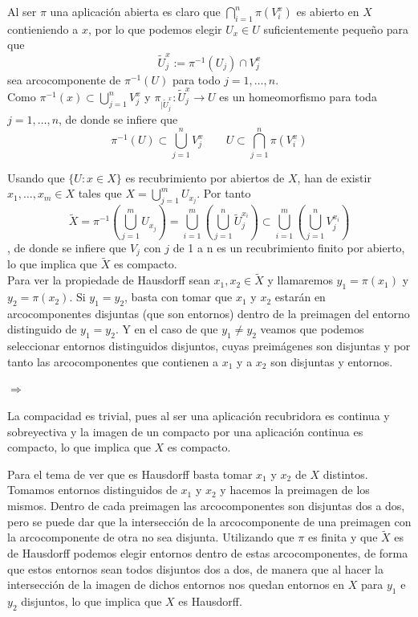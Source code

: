 \documentclass{article}
\begin{document}
Al ser $\pi$ una aplicación abierta es claro que $\bigcap_{i=1}^n \pi(V_i^x)$ es abierto en $X$ contieniendo a $x$, por lo que podemos elegir $U_x\in U$ suficientemente pequeño para que
\begin{equation*}
\tilde{U}_j^x:=\pi^{-1}(U_j)\cap V_j^x
\end{equation*}
sea arcocomponente de $\pi^{-1}(U)$ para todo $j=1,\ldots,n$.\\

Como $\pi^{-1}(x)\subset \bigcup_{j=1}^n V_j^x$ y $\pi_{|\tilde{U}_j^x}:\tilde{U}_j^x\rightarrow U$ es un homeomorfismo para toda $j=1,\ldots,n$, de donde se infiere que
\begin{equation*}
\pi^{-1}(U)\subset \bigcup_{j=1}^n V_j^x \qquad U\subset \bigcap_{j=1}^n \pi(V_i^x)
\end{equation*}

Usando que $\{U:x\in X\}$ es recubrimiento por abiertos de $X$, han de existir $x_1,\ldots,x_m\in X$ tales que $X=\bigcup_{j=1}^m U_{x_j}$. Por tanto
\begin{equation*}
\tilde{X}=\pi^{-1}\left(\bigcup_{j=1}^m U_{x_j}\right) = \bigcup_{i=1}^m \left(\bigcup_{j=1}^n \tilde{U}_j^{x_i}\right)\subset \bigcup_{i=1}^m\left(\bigcup_{j=1}^n V_j^{x_i}\right)
\end{equation*}, de donde se infiere que $V_j$ con $j$ de 1 a n es un recubrimiento finito por abierto, lo que implica que $\tilde{X}$ es compacto.\\

Para ver la propiedade de Hausdorff sean $x_1,x_2\in \tilde{X}$ y llamaremos $y_1=\pi(x_1)$ y $y_2=\pi(x_2)$. Si $y_1=y_2$, basta con tomar que $x_1$ y $x_2$ estarán en arcocomponentes disjuntas (que son entornos) dentro de la preimagen del entorno distinguido de $y_1=y_2$. Y en el caso de que $y_1\neq y_2$ veamos que podemos seleccionar entornos distinguidos disjuntos, cuyas preimágenes son disjuntas y por tanto las arcocomponentes que contienen a $x_1$ y a $x_2$ son disjuntas y entornos.

$\Rightarrow$

La compacidad es trivial, pues al ser una aplicación recubridora es continua y sobreyectiva y la imagen de un compacto por una aplicación continua es compacto, lo que implica que $X$ es compacto.

Para el tema de ver que es Hausdorff basta tomar $x_1$ y $x_2$ de $X$ distintos. Tomamos entornos distinguidos de $x_1$ y $x_2$ y hacemos la preimagen de los mismos. Dentro de cada preimagen las arcocomponentes son disjuntas dos a dos, pero se puede dar que la intersección de la arcocomponente de una preimagen con la arcocomponente de otra no sea disjunta. Utilizando que $\pi$ es finita y que $\tilde{X}$ es de Hausdorff podemos elegir entornos dentro de estas arcocomponentes, de forma que estos entornos sean todos disjuntos dos a dos, de manera que al hacer la intersección de la imagen de dichos entornos nos quedan entornos en $X$ para $y_1$ e $y_2$ disjuntos, lo que implica que $X$ es Hausdorff.
\end{document}
